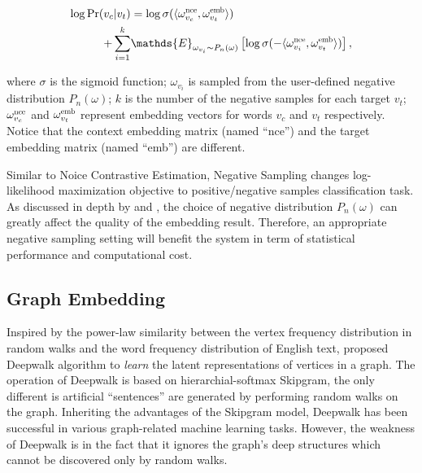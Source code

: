 \documentclass[letterpaper]{article}
\begin{document}
            \begin{equation}
                \label{eq:objneg}
                \begin{aligned}
                \log \mbox{Pr} (v_c | v_t) & = \log \sigma( \langle \omega^{\scalebox{0.7}{nce}}_{v_c} , \omega^{\scalebox{0.7}{emb}}_{v_t} \rangle ) \\
                + \sum_{i=1}^{k} & \mathds{E}_{\omega_{v_i} \sim P_n(\omega)} \left[ \log \sigma( -\langle \omega^{\scalebox{0.7}{nce}}_{v_i} , \omega^{\scalebox{0.7}{emb}}_{v_t} \rangle) \right],
                \end{aligned}
            \end{equation}
            
            \noindent
            where $\sigma$ is the sigmoid function; $\omega_{v_i}$ is sampled from the user-defined
            negative distribution $P_n(\omega)$; $k$ is the number of the negative samples for each target
            $v_t$; $\omega^{\scalebox{0.7}{nce}}_{v_c}$ and $\omega^{\scalebox{0.7}{emb}}_{v_t}$ 
            represent embedding vectors for words $v_c$ and $v_t$ respectively. Notice that the
            context embedding matrix (named ``nce'') and the target embedding matrix (named ``emb'')
            are different.

            Similar to Noice Contrastive Estimation, Negative Sampling changes log-likelihood
            maximization objective to positive/negative samples classification task. As discussed
            in depth by \cite{nce} and \cite{skipgram}, the choice of negative distribution 
            $P_n(\omega)$ can greatly affect the quality of the embedding result. Therefore, an
            appropriate negative sampling setting will benefit the system in term of statistical
            performance and computational cost.

        \subsection{Graph Embedding}
            
            Inspired by the power-law similarity between the vertex frequency distribution in
            random walks and the word frequency distribution of English text, \cite{deepwalk} proposed
            Deepwalk algorithm to \emph{learn} the latent representations of vertices in a
            graph. The operation of Deepwalk is based on hierarchial-softmax
            Skipgram, the only different is artificial ``sentences'' are generated by performing
            random walks on the graph. Inheriting the advantages of the Skipgram model, Deepwalk
            has been successful in various graph-related machine learning tasks. However, the weakness
            of Deepwalk is in the fact that it ignores the graph's deep structures which cannot 
            be discovered only by random walks. 
\end{document}
